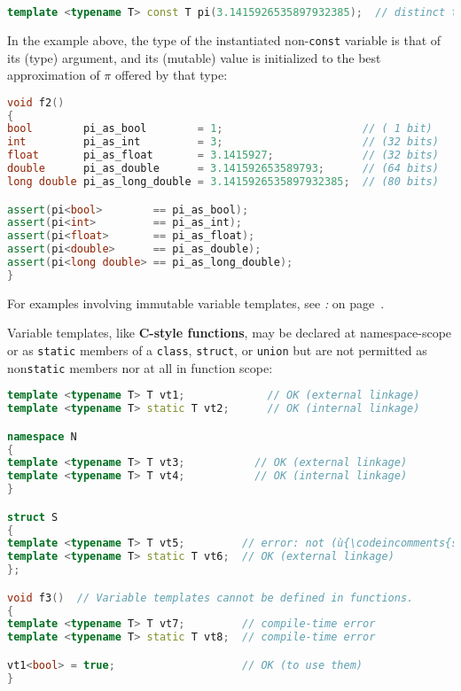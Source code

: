 \begin{lstlisting}[language=C++]
template <typename T> const T pi(3.1415926535897932385);  // distinct types
\end{lstlisting}

\noindent In the example above, the type of the instantiated non-\texttt{const}
variable is that of its (type) argument, and its (mutable) value is
initialized to the best approximation of \(\pi\) offered by that type:

\begin{lstlisting}[language=C++]
void f2()
{
bool        pi_as_bool        = 1;                      // ( 1 bit)
int         pi_as_int         = 3;                      // (32 bits)
float       pi_as_float       = 3.1415927;              // (32 bits)
double      pi_as_double      = 3.141592653589793;      // (64 bits)
long double pi_as_long_double = 3.1415926535897932385;  // (80 bits)

assert(pi<bool>        == pi_as_bool);
assert(pi<int>         == pi_as_int);
assert(pi<float>       == pi_as_float);
assert(pi<double>      == pi_as_double);
assert(pi<long double> == pi_as_long_double);
}
\end{lstlisting}

\noindent For examples involving immutable variable templates, see {\it{}:} {\it{}} on page~\pageref{parametrized-constants}.

Variable templates, like \textbf{C-style functions}, may be declared at
namespace-scope or as \texttt{static} members of a
\texttt{class}, \texttt{struct}, or \texttt{union} but are not
permitted as non\texttt{static} members nor at all in function scope:

\begin{lstlisting}[language=C++]
template <typename T> T vt1;             // OK (external linkage)
template <typename T> static T vt2;      // OK (internal linkage)

namespace N
{
template <typename T> T vt3;           // OK (external linkage)
template <typename T> T vt4;           // OK (internal linkage)
}

struct S
{
template <typename T> T vt5;         // error: not (ù{\codeincomments{static}}ù)
template <typename T> static T vt6;  // OK (external linkage)
};

void f3()  // Variable templates cannot be defined in functions.
{
template <typename T> T vt7;         // compile-time error
template <typename T> static T vt8;  // compile-time error

vt1<bool> = true;                    // OK (to use them)
}
\end{lstlisting}


